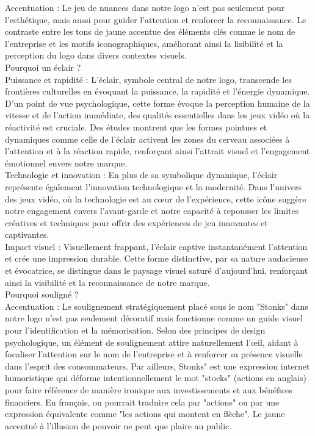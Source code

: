 Accentuation : Le jeu de nuances dans notre logo n'est pas seulement pour l'esthétique, mais aussi pour guider l'attention et renforcer la reconnaissance. Le contraste entre les tons de jaune accentue des éléments clés comme le nom de l'entreprise et les motifs iconographiques, améliorant ainsi la lisibilité et la perception du logo dans divers contextes visuels. 
\\

Pourquoi un éclair ? 
\\

Puissance et rapidité : L'éclair, symbole central de notre logo, transcende les frontières culturelles en évoquant la puissance, la rapidité et l'énergie dynamique. D'un point de vue psychologique, cette forme évoque la perception humaine de la vitesse et de l'action immédiate, des qualités essentielles dans les jeux vidéo où la réactivité est cruciale. Des études montrent que les formes pointues et dynamiques comme celle de l'éclair activent les zones du cerveau associées à l'attention et à la réaction rapide, renforçant ainsi l'attrait visuel et l'engagement émotionnel envers notre marque. 
\\

Technologie et innovation : En plus de sa symbolique dynamique, l'éclair représente également l'innovation technologique et la modernité. Dans l'univers des jeux vidéo, où la technologie est au cœur de l'expérience, cette icône suggère notre engagement envers l'avant-garde et notre capacité à repousser les limites créatives et techniques pour offrir des expériences de jeu innovantes et captivantes. 
\\

Impact visuel : Visuellement frappant, l'éclair captive instantanément l'attention et crée une impression durable. Cette forme distinctive, par sa nature audacieuse et évocatrice, se distingue dans le paysage visuel saturé d'aujourd'hui, renforçant ainsi la visibilité et la reconnaissance de notre marque. 
\\

Pourquoi souligné ? 
\\

Accentuation : Le soulignement stratégiquement placé sous le nom "Stonks" dans notre logo n'est pas seulement décoratif mais fonctionne comme un guide visuel pour l'identification et la mémorisation. Selon des principes de design psychologique, un élément de soulignement attire naturellement l'œil, aidant à focaliser l'attention sur le nom de l'entreprise et à renforcer sa présence visuelle dans l'esprit des consommateurs. Par ailleurs, Stonks" est une expression internet humoristique qui déforme intentionnellement le mot "stocks" (actions en anglais) pour faire référence de manière ironique aux investissements et aux bénéfices financiers. En français, on pourrait traduire cela par "actions" ou par une expression équivalente comme "les actions qui montent en flèche". Le jaune accentué à l’illusion de pouvoir ne peut que plaire au public. 
\\

